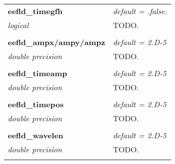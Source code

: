 \begin{Spacing}{1.0}
\begin{longtable}{ p{} p{} }
   \textbf{eefld\_timegfh}
   &  \textit{default = .false. }
   \\*\textit{logical}
   & TODO.\\* \\

   \textbf{eefld\_ampx/ampy/ampz}
   &  \textit{default = 2.D-5}
   \\*\textit{double precision}
   & TODO.\\* \\

   \textbf{eefld\_timeamp}
   &  \textit{default = 2.D-5}
   \\*\textit{double precision}
   & TODO.\\* \\

   \textbf{eefld\_timepos}
   &  \textit{default = 2.D-5}
   \\*\textit{double precision}
   & TODO.\\* \\

   \textbf{eefld\_wavelen}
   &  \textit{default = 2.D-5}
   \\*\textit{double precision}
   & TODO.\\* \\


\end{longtable}
\end{Spacing}
